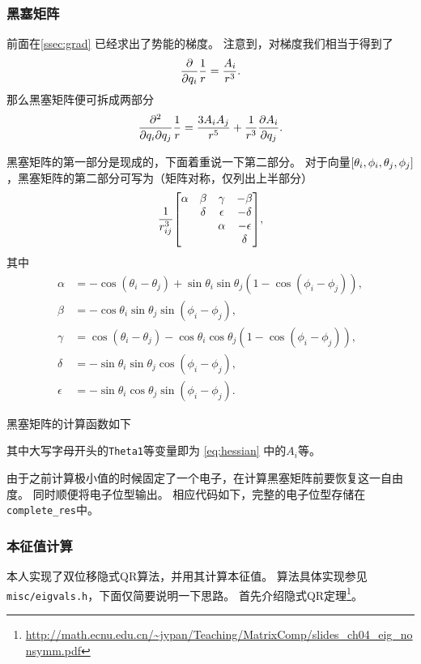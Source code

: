 \subsubsection{黑塞矩阵}
前面在\autoref{ssec:grad} 已经求出了势能的梯度。
注意到，对梯度我们相当于得到了
\begin{equation}
    \pdv{q_i}\frac{1}{r} = \frac{A_i}{r^3}.
\end{equation}
那么黑塞矩阵便可拆成两部分
\begin{equation}\label{eq:hessian}
    \pdv{}{q_i}{q_j} \frac{1}{r}
    = \frac{3A_iA_j}{r^5} + \frac{1}{r^3}\pdv{A_i}{q_j}.
\end{equation}

黑塞矩阵的第一部分是现成的，下面着重说一下第二部分。
对于向量$\qty[\theta_i, \phi_i, \theta_j, \phi_j]$，黑塞矩阵的第二部分可写为（矩阵对称，仅列出上半部分）
\begin{equation}
    \frac{1}{r^3_{ij}}\mqty[
        \alpha& \beta&  \gamma& -\beta\\
        &   \delta& \epsilon&   -\delta\\
        &&  \alpha& -\epsilon\\
        &&& \delta
    ],
\end{equation}
其中
\begin{align}
    \alpha &{}= -\cos(\theta_i - \theta_j) + \sin{\theta_i}\sin{\theta_j}(1-\cos(\phi_i - \phi_j)),\\
    \beta &{}= -\cos{\theta_i}\sin{\theta_j}\sin(\phi_i - \phi_j),\\
    \gamma &{}= \cos(\theta_i - \theta_j) - \cos{\theta_i}\cos{\theta_j}(1-\cos(\phi_i - \phi_j)),\\
    \delta &{}= -\sin{\theta_i}\sin{\theta_j}\cos(\phi_i - \phi_j),\\
    \epsilon &{}= -\sin{\theta_i}\cos{\theta_j}\sin(\phi_i - \phi_j).
\end{align}

黑塞矩阵的计算函数如下
{
    \linespread{1.0}
    
}
其中大写字母开头的\texttt{Theta1}等变量即为 \eqref{eq:hessian} 中的$A_i$等。

由于之前计算极小值的时候固定了一个电子，在计算黑塞矩阵前要恢复这一自由度。
同时顺便将电子位型输出。
相应代码如下，完整的电子位型存储在\texttt{complete\_res}中。
{
    \linespread{1.0}
    
}

\subsubsection{本征值计算}
本人实现了双位移隐式QR算法，并用其计算本征值。
算法具体实现参见\texttt{misc/eigvals.h}，下面仅简要说明一下思路。
首先介绍隐式QR定理\footnote{\url{http://math.ecnu.edu.cn/~jypan/Teaching/MatrixComp/slides_ch04_eig_nonsymm.pdf}}。

